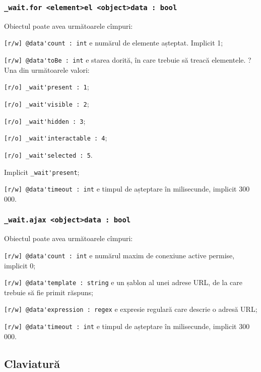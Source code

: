 \subsubsection{\lstinline|_wait.for <element>el <object>data : bool|}

Obiectul  poate avea următoarele cîmpuri:
\begin{icItems}
	\item \lstinline|[r/w] @data'count : int| e numărul de elemente așteptat. Implicit 1;
	\item \lstinline|[r/w] @data'toBe : int| e starea dorită, în care trebuie să treacă elementele. ?Una din următoarele valori:
	\begin{icItems}
		\item \lstinline|[r/o] _wait'present : 1|;
		\item \lstinline|[r/o] _wait'visible : 2|;
		\item \lstinline|[r/o] _wait'hidden : 3|;
		\item \lstinline|[r/o] _wait'interactable : 4|;
		\item \lstinline|[r/o] _wait'selected : 5|.
	\end{icItems}
	Implicit \lstinline|_wait'present|;
	\item \lstinline|[r/w] @data'timeout : int| e timpul de așteptare în milisecunde, implicit 300 000.
\end{icItems}

\subsubsection{\lstinline|_wait.ajax <object>data : bool|}

Obiectul  poate avea următoarele cîmpuri:
\begin{icItems}
	\item \lstinline|[r/w] @data'count : int| e numărul maxim de conexiune active permise, implicit 0;
	\item \lstinline|[r/w] @data'template : string| e un șablon al unei adrese URL, de la care trebuie să fie primit răspuns;
	\item \lstinline|[r/w] @data'expression : regex| e expresie regulară care descrie o adresă URL;
	\item \lstinline|[r/w] @data'timeout : int| e timpul de așteptare în milisecunde, implicit 300 000.
\end{icItems}

\subsection{Claviatură}

